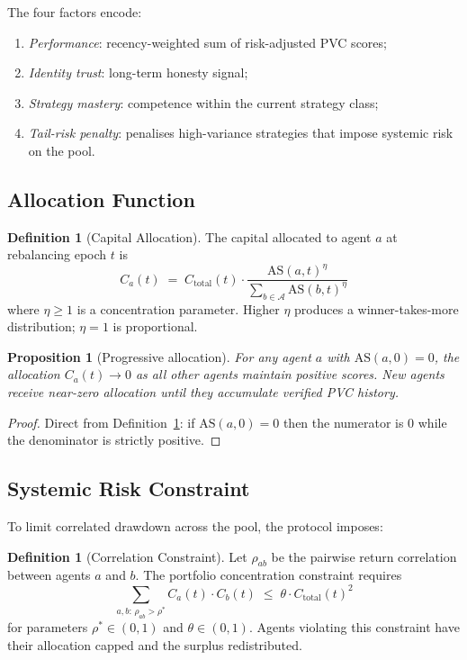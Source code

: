 \documentclass[11pt,a4paper]{article}
\theoremstyle{plain}
\newtheorem{proposition}[theorem]{Proposition}
\theoremstyle{definition}
\newtheorem{definition}[theorem]{Definition}
\theoremstyle{remark}
\newcommand{\AS}{\mathrm{AS}}
\begin{document}
The four factors encode:
\begin{enumerate}[(1)]
  \item \textit{Performance}: recency-weighted sum of risk-adjusted PVC scores;
  \item \textit{Identity trust}: long-term honesty signal;
  \item \textit{Strategy mastery}: competence within the current strategy class;
  \item \textit{Tail-risk penalty}: penalises high-variance strategies that
        impose systemic risk on the pool.
\end{enumerate}

\subsection{Allocation Function}

\begin{definition}[Capital Allocation]
\label{def:allocation}
The capital allocated to agent $a$ at rebalancing epoch $t$ is
\[
  C_a(t)
  \;=\;
  C_{\mathrm{total}}(t)
  \cdot
  \frac{\AS(a, t)^{\eta}}{\displaystyle\sum_{b \in \mathcal{A}} \AS(b, t)^{\eta}}
\]
where $\eta \ge 1$ is a concentration parameter. Higher $\eta$ produces a
winner-takes-more distribution; $\eta = 1$ is proportional.
\end{definition}

\begin{proposition}[Progressive allocation]
For any agent $a$ with $\AS(a, 0) = 0$, the allocation $C_a(t) \to 0$ as
all other agents maintain positive scores. New agents receive near-zero
allocation until they accumulate verified PVC history.
\end{proposition}

\begin{proof}
Direct from Definition~\ref{def:allocation}: if $\AS(a,0) = 0$ then the
numerator is 0 while the denominator is strictly positive.
\end{proof}

\subsection{Systemic Risk Constraint}

To limit correlated drawdown across the pool, the protocol imposes:

\begin{definition}[Correlation Constraint]
Let $\rho_{ab}$ be the pairwise return correlation between agents $a$ and $b$.
The portfolio concentration constraint requires
\[
  \sum_{a,b:\,\rho_{ab} > \rho^*} C_a(t) \cdot C_b(t)
  \;\le\;
  \theta \cdot C_{\mathrm{total}}(t)^2
\]
for parameters $\rho^* \in (0,1)$ and $\theta \in (0,1)$. Agents violating this
constraint have their allocation capped and the surplus redistributed.
\end{definition}
\end{document}

